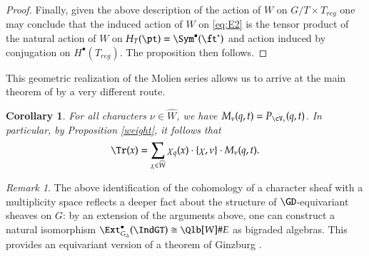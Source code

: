 \documentclass[12pt]{amsart}
\newtheorem{cor}[thm]{Corollary}
\theoremstyle{remark}
\newtheorem{remark}{Remark}
\begin{document}
\begin{proof}
Finally, given the above description of the action of $W$ on $G/T \times T_{reg}$ one may conclude that the induced action of $W$ on \eqref{eq:E2} is the tensor product of the natural action of $W$ on $H_T(\pt) = \Sym^\bullet(\ft^*)$ and action induced by conjugation on $H^\bullet(T_{reg})$. The proposition then follows.
\end{proof}

This geometric realization of the Molien series allows us to arrive at
the main theorem of \cite{Gomi} by a very different route.
\begin{cor}\label{final}
  For all characters $\nu\in \widehat W$, we have
  $M_\nu(q,t)=P_{\cV_\nu}(q,t)$. In particular, by Proposition
  \ref{weight}, it follows that%
  \begin{equation*}
    \Tr(x)=\sum_{\chi\in\widehat W}\chi_q(x)\cdot\{\chi,\nu\}\cdot M_\nu(q,t).
  \end{equation*}
\end{cor}



\begin{remark}\label{smash}
  The above identification of the cohomology of a character sheaf with a multiplicity space reflects a deeper fact about the structure of $\GD$-equivariant sheaves on $G$: by an extension of the arguments above, one can construct a natural isomorphism $\Ext^\bullet_{G_{\Delta}}(\IndGT)\cong \Qlb[W]\#E$ as bigraded algebras. This provides an equivariant version of a theorem of Ginzburg \cite[Theorem 8.1]{Ginzburg-character}. \end{remark}




\end{document}
